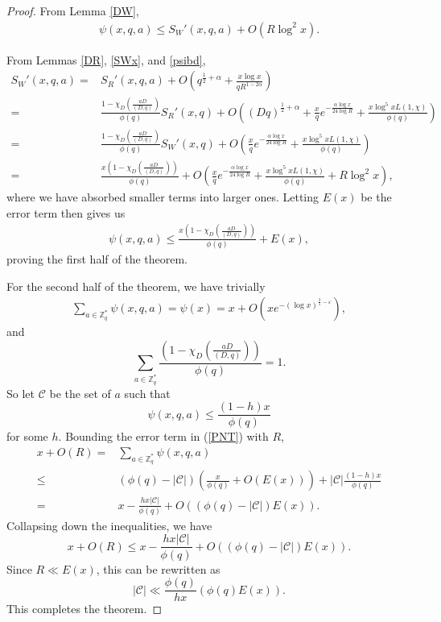 \documentclass{amsart}
\begin{document}
\begin{proof}
From Lemma \ref{DW},
\begin{align*}
\psi(x,q,a)\leq S_W'(x,q,a)+O\left(R\log^2 x\right).
\end{align*}

From Lemmas \ref{DR}, \ref{SWx}, and \ref{psibd},
\begin{align*}
S_W'(x,q,a)=&S_R'(x,q,a)+O\left(q^{\frac 12+\alpha}+\frac{x\log x}{qR^{1-2\alpha}}\right)\\
=&\frac{1-\chi_D\left(\frac{aD}{(D,q)}\right)}{\phi(q)}S_R'(x,q)+O\left((Dq)^{\frac 12+\alpha}+\frac xqe^{-\frac{\alpha\log x}{24\log R}}+\frac{x\log^5 xL(1,\chi)}{\phi(q)}\right)\\
=&\frac{1-\chi_D\left(\frac{aD}{(D,q)}\right)}{\phi(q)}S_W'(x,q)+O\left(\frac xqe^{-\frac{\alpha\log x}{24\log R}}+\frac{x\log^5 xL(1,\chi)}{\phi(q)}\right)\\
=&\frac{x\left(1-\chi_D\left(\frac{aD}{(D,q)}\right)\right)}{\phi(q)}+O\left(\frac xqe^{-\frac{\alpha\log x}{24\log R}}+\frac{x\log^5 xL(1,\chi)}{\phi(q)}+R\log^2 x\right),
\end{align*}
where we have absorbed smaller terms into larger ones.  Letting $E(x)$ be the error term then gives us
\begin{gather}\label{psibd1} \psi(x,q,a)\leq \frac{x\left(1-\chi_D\left(\frac{aD}{(D,q)}\right)\right)}{\phi(q)}+E(x),\end{gather}
proving the first half of the theorem.

For the second half of the theorem, we have trivially
\begin{gather}\label{PNT}
\sum_{a\in \mathbb Z_q^*}\psi(x,q,a)=\psi(x)=x+O\left(xe^{-(\log x)^{\frac 35-\varepsilon}}\right),
\end{gather}
and
$$\sum_{a\in \mathbb Z_q^*}\frac{\left(1-\chi_D\left(\frac{aD}{(D,q)}\right)\right)}{\phi(q)}=1.$$
So let $\mathcal C$ be the set of $a$ such that
$$\psi(x,q,a)\leq \frac{(1-h)x}{\phi(q)}$$
for some $h$.  Bounding the error term in (\ref{PNT}) with $R$,
\begin{align*}x+O\left(R\right)=&\sum_{a\in \mathbb Z_q^*}\psi(x,q,a)\\
\leq &(\phi(q)-|\mathcal C|)\left(\frac{x}{\phi(q)}+O\left(E(x)\right)\right)+|\mathcal C|\frac{(1-h)x}{\phi(q)}\\
=& x-\frac{hx|\mathcal C|}{\phi(q)}+O\left((\phi(q)-|\mathcal C|)E(x)\right).
\end{align*}
Collapsing down the inequalities, we have
$$x+O\left(R\right)\leq x-\frac{hx|\mathcal C|}{\phi(q)}+O\left((\phi(q)-|\mathcal C|)E(x)\right).$$
Since $R\ll E(x)$, this can be rewritten as
$$|\mathcal C|\ll \frac{\phi(q)}{hx}\left(\phi(q)E(x)\right).$$
This completes the theorem.
\end{proof}
\end{document}
